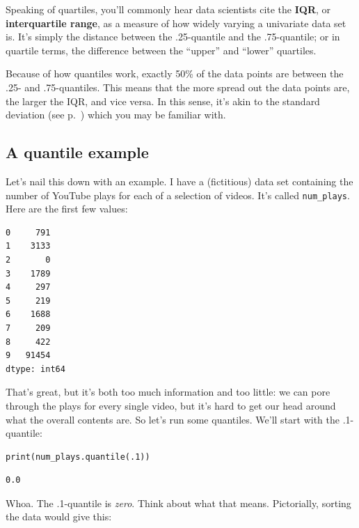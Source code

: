 \label{IQR}

Speaking of quartiles, you'll commonly hear data scientists cite the
\textbf{IQR}, or \textbf{interquartile range}, as a measure of how widely
varying a univariate data set is. It's simply the distance between the
.25-quantile and the .75-quantile; or in quartile terms, the difference between
the ``upper'' and ``lower'' quartiles.

Because of how quantiles work, exactly 50\% of the data points are between the
.25- and .75-quantiles. This means that the more spread out the data points
are, the larger the IQR, and vice versa. In this sense, it's akin to the
standard deviation (see p.~\pageref{standardDeviation}) which you may be
familiar with.

\subsection{A quantile example}

\label{YouTubeData}

Let's nail this down with an example. I have a (fictitious) data set containing
the number of YouTube plays for each of a selection of videos. It's called
\texttt{num\_plays}. Here are the first few values:

\begin{Verbatim}[fontsize=\small,samepage=true,frame=leftline,framesep=5mm,framerule=1mm]
0     791
1    3133
2       0
3    1789
4     297
5     219
6    1688
7     209
8     422
9   91454
dtype: int64
\end{Verbatim}

That's great, but it's both too much information and too little: we can pore
through the plays for every single video, but it's hard to get our head around
what the overall contents are. So let's run some quantiles. We'll start with
the .1-quantile:

\begin{Verbatim}[fontsize=\small,samepage=true,frame=single,framesep=3mm]
print(num_plays.quantile(.1))
\end{Verbatim}
\vspace{-.3in}

\begin{Verbatim}[fontsize=\small,samepage=true,frame=leftline,framesep=5mm,framerule=1mm]
0.0
\end{Verbatim}

\label{pointOneQuantileEpiphany}
Whoa. The .1-quantile is \textit{zero}. Think about what that means.
Pictorially, sorting the data would give this:

